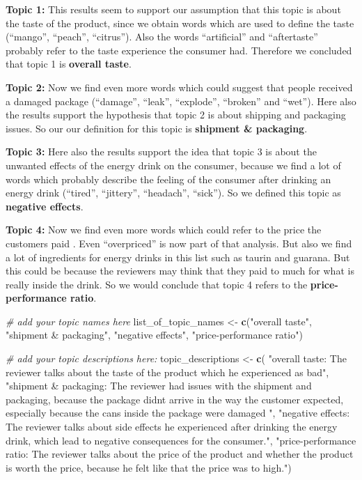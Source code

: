 \documentclass[
]{article}
\newenvironment{Shaded}{\begin{snugshade}}{\end{snugshade}}
\newcommand{\CommentTok}[1]{\textcolor[rgb]{0.56,0.35,0.01}{\textit{#1}}}
\newcommand{\FunctionTok}[1]{\textcolor[rgb]{0.13,0.29,0.53}{\textbf{#1}}}
\newcommand{\NormalTok}[1]{#1}
\newcommand{\OtherTok}[1]{\textcolor[rgb]{0.56,0.35,0.01}{#1}}
\newcommand{\StringTok}[1]{\textcolor[rgb]{0.31,0.60,0.02}{#1}}
\begin{document}
\normalsize

\textbf{Topic 1:} This results seem to support our assumption that this
topic is about the taste of the product, since we obtain words which are
used to define the taste (``mango'', ``peach'', ``citrus''). Also the
words ``artificial'' and ``aftertaste'' probably refer to the taste
experience the consumer had. Therefore we concluded that topic 1 is
\textbf{overall taste}.

\textbf{Topic 2:} Now we find even more words which could suggest that
people received a damaged package (``damage'', ``leak'', ``explode'',
``broken'' and ``wet''). Here also the results support the hypothesis
that topic 2 is about shipping and packaging issues. So our our
definition for this topic is \textbf{shipment \& packaging}.

\textbf{Topic 3:} Here also the results support the idea that topic 3 is
about the unwanted effects of the energy drink on the consumer, because
we find a lot of words which probably describe the feeling of the
consumer after drinking an energy drink (``tired'', ``jittery'',
``headach'', ``sick''). So we defined this topic as \textbf{negative
effects}.

\textbf{Topic 4:} Now we find even more words which could refer to the
price the customers paid . Even ``overpriced'' is now part of that
analysis. But also we find a lot of ingredients for energy drinks in
this list such as taurin and guarana. But this could be because the
reviewers may think that they paid to much for what is really inside the
drink. So we would conclude that topic 4 refers to the
\textbf{price-performance ratio}.

\begin{Shaded}
\begin{Highlighting}[]
\CommentTok{\# add your topic names here}
\NormalTok{list\_of\_topic\_names }\OtherTok{\textless{}{-}} \FunctionTok{c}\NormalTok{(}\StringTok{"overall taste"}\NormalTok{, }\StringTok{"shipment \& packaging"}\NormalTok{, }\StringTok{"negative effects"}\NormalTok{, }\StringTok{"price{-}performance ratio"}\NormalTok{)}

\CommentTok{\# add your topic descriptions here:}
\NormalTok{topic\_descriptions }\OtherTok{\textless{}{-}} \FunctionTok{c}\NormalTok{(}
  \StringTok{"overall taste: The reviewer talks about the taste of the product which he experienced as bad"}\NormalTok{,}
  \StringTok{"shipment \& packaging: The reviewer had issues with the shipment and packaging, because the package didnt      arrive in the way the customer expected, especially because the cans inside the package were damaged "}\NormalTok{,}
  \StringTok{"negative effects: The reviewer talks about side effects he experienced after drinking the energy drink, which   lead to negative consequences for the consumer."}\NormalTok{,}
  \StringTok{"price{-}performance ratio: The reviewer talks about the price of the product and whether the product is worth the price, because he felt like that the price was to high."}\NormalTok{)}
\end{Highlighting}
\end{Shaded}
\end{document}
